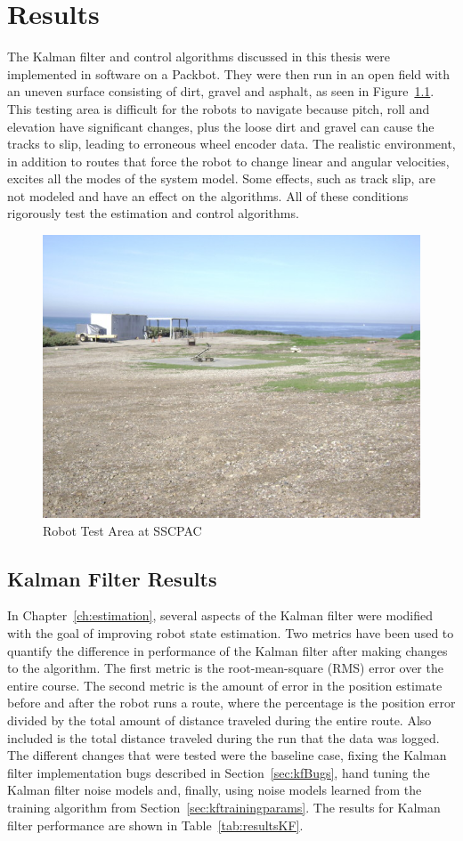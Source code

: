 \chapter{Results}%
\label{ch:results}
The Kalman filter and control algorithms discussed in this thesis were implemented in software on a Packbot.
They were then run in an open field with an uneven surface consisting of dirt, gravel and asphalt, as seen in Figure~\ref{fig:resultsTestArea}.
This testing area is difficult for the robots to navigate because pitch, roll and elevation have significant changes, plus the loose dirt and gravel can cause the tracks to slip, leading to erroneous wheel encoder data.
The realistic environment, in addition to routes that force the robot to change linear and angular velocities, excites all the modes of the system model.
Some effects, such as track slip, are not modeled and have an effect on the algorithms.
All of these conditions rigorously test the estimation and control algorithms.

\begin{figure}[ht!]
\centering
\includegraphics[width=.75\textwidth]{images/flightFieldTestArea}
\caption{Robot Test Area at SSCPAC}%
\label{fig:resultsTestArea}
\end{figure}

\section{Kalman Filter Results}%
\label{sec:kfResults}
In Chapter~\ref{ch:estimation}, several aspects of the Kalman filter were modified with the goal of improving robot state estimation.
Two metrics have been used to quantify the difference in performance of the Kalman filter after making changes to the algorithm.
The first metric is the root-mean-square (RMS) error over the entire course.
The second metric is the amount of error in the position estimate before and after the robot runs a route, where the percentage is the position error divided by the total amount of distance traveled during the entire route.
Also included is the total distance traveled during the run that the data was logged.
The different changes that were tested were the baseline case, fixing the Kalman filter implementation bugs described in Section~\ref{sec:kfBugs}, hand tuning the Kalman filter noise models and, finally, using noise models learned from the training algorithm from Section~\ref{sec:kftrainingparams}.
The results for Kalman filter performance are shown in Table~\ref{tab:resultsKF}.


